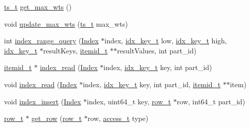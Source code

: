 \begin{DoxyCompactItemize}
\item 
\hyperlink{global_8h_aaf095dfc9b10f757c968fe146ad7e724}{ts\+\_\+t} \hyperlink{classtxn__man_a12f84c603f952cb40c048d799ff43245}{get\+\_\+max\+\_\+wts} ()
\item 
void \hyperlink{classtxn__man_ae9f87c4e9565645d4297e07afe96daeb}{update\+\_\+max\+\_\+wts} (\hyperlink{global_8h_aaf095dfc9b10f757c968fe146ad7e724}{ts\+\_\+t} max\+\_\+wts)
\item 
int \hyperlink{classtxn__man_aa8a892b52707588c411662822359b63a}{index\+\_\+range\+\_\+query} (\hyperlink{classIndex}{Index} $\ast$index, \hyperlink{global_8h_a29a17e29c9200c833b70a4ef8c89813e}{idx\+\_\+key\+\_\+t} low, \hyperlink{global_8h_a29a17e29c9200c833b70a4ef8c89813e}{idx\+\_\+key\+\_\+t} high, \hyperlink{global_8h_a29a17e29c9200c833b70a4ef8c89813e}{idx\+\_\+key\+\_\+t} $\ast$result\+Keys, \hyperlink{classitemid__t}{itemid\+\_\+t} $\ast$$\ast$result\+Values, int part\+\_\+id)
\item 
\hyperlink{classitemid__t}{itemid\+\_\+t} $\ast$ \hyperlink{classtxn__man_a3fa753d12f78c728e33f86c5c119a191}{index\+\_\+read} (\hyperlink{classIndex}{Index} $\ast$index, \hyperlink{global_8h_a29a17e29c9200c833b70a4ef8c89813e}{idx\+\_\+key\+\_\+t} key, int part\+\_\+id)
\item 
void \hyperlink{classtxn__man_a20dbd5004ecb977f109e54fd0f60950f}{index\+\_\+read} (\hyperlink{classIndex}{Index} $\ast$index, \hyperlink{global_8h_a29a17e29c9200c833b70a4ef8c89813e}{idx\+\_\+key\+\_\+t} key, int part\+\_\+id, \hyperlink{classitemid__t}{itemid\+\_\+t} $\ast$$\ast$item)
\item 
void \hyperlink{classtxn__man_ae90afaf5c0ba23e804f6719c41d65499}{index\+\_\+insert} (\hyperlink{classIndex}{Index} $\ast$index, uint64\+\_\+t key, \hyperlink{classrow__t}{row\+\_\+t} $\ast$row, int64\+\_\+t part\+\_\+id)
\item 
\hyperlink{classrow__t}{row\+\_\+t} $\ast$ \hyperlink{classtxn__man_aa9ae01517fa1520cb8c910f72afb72d1}{get\+\_\+row} (\hyperlink{classrow__t}{row\+\_\+t} $\ast$row, \hyperlink{global_8h_a567f81b0ae33b00d189d7714e9fde0bc}{access\+\_\+t} type)
\end{DoxyCompactItemize}
